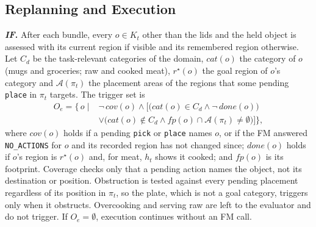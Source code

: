 \subsection{Replanning and Execution}
\label{sec:supp-replanning}
\noindent\textbf{\textit{IF}.} After each bundle, every $o\in K_t$ other than the lids and the held object is
assessed with its current region if visible and its remembered region otherwise. Let $C_d$ be the task-relevant
categories of the domain, $\mathit{cat}(o)$ the category of $o$ (mugs and groceries; raw and cooked meat), $r^\star(o)$ the goal region of $o$'s category
and $\mathcal{A}(\pi_t)$ the placement areas of the regions that some pending \texttt{place} in $\pi_t$ targets.
The trigger set is
\begin{equation}
\begin{aligned}
O_e=\big\{\,o \;\big|\;& \neg\,\mathit{cov}(o) \wedge \big[\big(\mathit{cat}(o)\in C_d \wedge \neg\,\mathit{done}(o)\big)\\
&\vee \big(\mathit{cat}(o)\notin C_d \wedge \mathit{fp}(o)\cap\mathcal{A}(\pi_t)\neq\emptyset\big)\big]\big\},
\end{aligned}
\label{eq:supp-trigger}
\end{equation}
where $\mathit{cov}(o)$ holds if a pending \texttt{pick} or \texttt{place} names $o$, or if the FM answered
\texttt{NO\_ACTIONS} for $o$ and its recorded region has not changed since; $\mathit{done}(o)$ holds if $o$'s
region is $r^\star(o)$ and, for meat, $h_t$ shows it cooked; and $\mathit{fp}(o)$ is its footprint. Coverage checks
only that a pending action names the object, not its destination or position. Obstruction is tested against
every pending placement regardless of its position in $\pi_t$, so the plate, which is not a goal category, triggers
only when it obstructs. Overcooking and serving raw are left to the evaluator and do not trigger. If
$O_e=\emptyset$, execution continues without an FM call.

